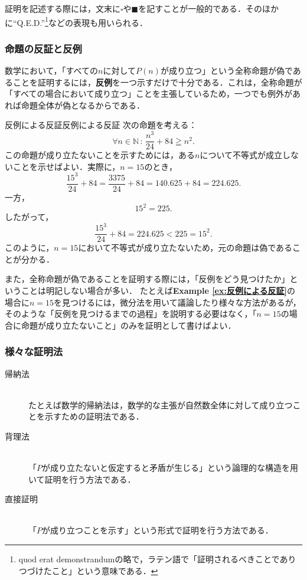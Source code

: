 \documentclass[a4paper,11pt]{ltjsarticle}
\newcommand{\exref}[1]{{\bfseries\sffamily Example \ref{ex:#1}}}
\renewcommand{\geq}{\geqq}
\begin{document}
\begin{mycolumn}
  証明を記述する際には，文末に$\square$や$\blacksquare$を記すことが一般的である．そのほかに``Q.E.D.''\footnote{quod erat demonstrandumの略で，ラテン語で「証明されるべきことでありつづけたこと」という意味である．}などの表現も用いられる．
\end{mycolumn}

\subsubsection{命題の反証と反例}

数学において，「すべての$n$に対して$P(n)$が成り立つ」という全称命題が偽であることを証明するには，\textbf{反例}を一つ示すだけで十分である．これは，全称命題が「すべての場合において成り立つ」ことを主張しているため，一つでも例外があれば命題全体が偽となるからである．

\begin{example}{反例による反証}{反例による反証}
  次の命題を考える：
  \[
    \forall n \in \mathbb{N}\, : \, \frac{n^3}{24} + 84 \geq n^2.
  \]
  この命題が成り立たないことを示すためには，ある$n$について不等式が成立しないことを示せばよい．実際に，$n = 15$のとき，
  \[
    \frac{15^3}{24} + 84 = \frac{3375}{24} + 84 = 140.625 + 84 = 224.625.
  \]
  一方，
  \[
    15^2 = 225.
  \]
  したがって，
  \[
    \frac{15^3}{24} + 84 = 224.625 < 225 = 15^2.
  \]
  このように，$n = 15$において不等式が成り立たないため，元の命題は偽であることが分かる．
\end{example}

また，全称命題が偽であることを証明する際には，「反例をどう見つけたか」ということは明記しない場合が多い．
たとえば\exref{反例による反証}の場合に$n=15$を見つけるには，微分法を用いて議論したり様々な方法があるが，そのような「反例を見つけるまでの過程」を説明する必要はなく，「$n=15$の場合に命題が成り立たないこと」のみを証明として書けばよい．

\subsubsection{様々な証明法}

\begin{description}
  \item[帰納法] \mbox{} \\
        たとえば数学的帰納法は，数学的な主張が自然数全体に対して成り立つことを示すための証明法である．
  \item[背理法] \mbox{} \\
        「$P$が成り立たないと仮定すると矛盾が生じる」という論理的な構造を用いて証明を行う方法である．
  \item[直接証明] \mbox{} \\
        「$P$が成り立つことを示す」という形式で証明を行う方法である．
\end{description}
\end{document}
